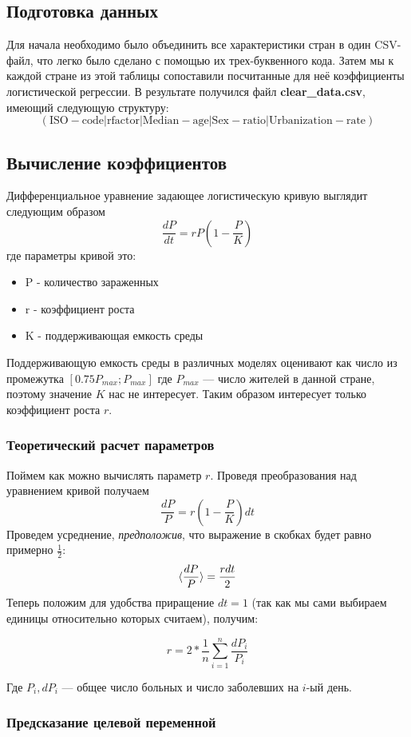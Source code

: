 \documentclass{article}
\begin{document}
\subsection{Подготовка данных}
Для начала необходимо было объединить все характеристики стран в один CSV-файл, что легко было сделано с помощью их трех-буквенного кода. Затем мы к каждой стране из этой таблицы сопоставили посчитанные для неё коэффициенты логистической регрессии. В результате получился файл \textbf{clear\_data.csv}, имеющий следующую структуру:
\[\mathrm{(ISO-code|rfactor|Median-age|Sex-ratio|Urbanization -rate)}\]

\subsection{Вычисление коэффициентов}
Дифференциальное уравнение задающее логистическую кривую выглядит следующим образом
\[\frac{dP}{dt} = rP(1-\frac{P}{K})\]
где параметры кривой это:
\begin{itemize}
    \item P - количество зараженных
    \item r - коэффициент роста
    \item K - поддерживающая емкость среды
\end{itemize} 
Поддерживающую емкость среды в различных моделях оценивают как число из промежутка \([0.75P_{max}; P_{max}]\) где \(P_{max}\) --- число жителей в данной стране, поэтому значение \(K\) нас не интересует. Таким образом интересует только коэффициент роста \(r\).

\subsubsection{Теоретический расчет параметров}
Поймем как можно вычислять параметр \(r\). Проведя преобразования над уравнением кривой получаем
\[\frac{dP}{P} = r\left(1 - \frac{P}{K}\right)dt\]
Проведем усреднение, \textit{предположив}, что выражение в скобках будет равно примерно \(\frac{1}{2}\):
\[\braket{\frac{dP}{P}} = \frac{rdt}{2}\]
Теперь положим для удобства приращение \(dt = 1\) (так как мы сами выбираем единицы относительно которых считаем), получим:

\[r = 2 * \frac{1}{n}\sum_{i=1}^{n} \frac{dP_i}{P_i}\]

Где \(P_i, dP_i\) --- общее число больных и число заболевших на \(i\)-ый день.

\subsubsection{Предсказание целевой переменной}
\end{document}
